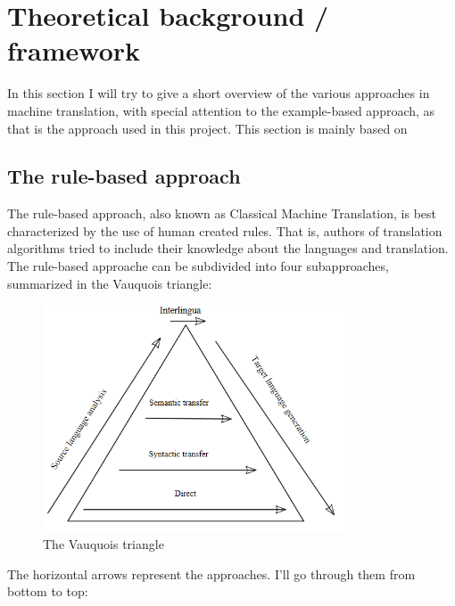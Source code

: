 \documentclass[12pt]{article}
\begin{document}
\section{Theoretical background / framework}

In this section I will try to give a short overview of the various approaches in machine translation, with special attention to the example-based approach, as that is the approach used in this project. This section is mainly based on %

\subsection{The rule-based approach}

The rule-based approach, also known as Classical Machine Translation, is best characterized by the use of human created rules. That is, authors of translation algorithms tried to include their knowledge about the languages and translation. The rule-based approache can be subdivided into four subapproaches, summarized in the Vauquois triangle: \\

\begin{figure}[htb]
\centering
\includegraphics[width=0.8\textwidth]{vauquois.png}
\caption{The Vauquois triangle}
\label{fig:vauquois}
\end{figure}

The horizontal arrows represent the approaches. I'll go through them from bottom to top:
\end{document}
